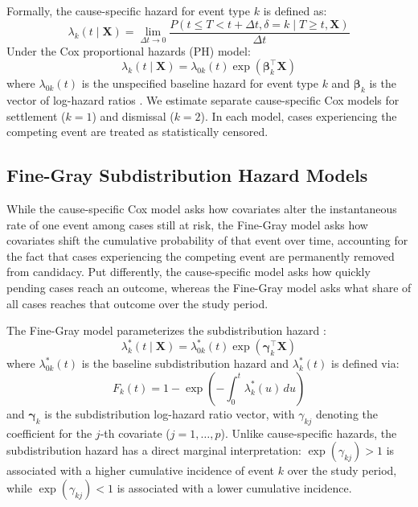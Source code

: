 Formally, the cause-specific hazard for event type $k$ is defined as:
\begin{equation}
\lambda_k(t \mid \mathbf{X}) = \lim_{\Delta t \to 0} \frac{P(t \leq T < t + \Delta t, \delta = k \mid T \geq t, \mathbf{X})}{\Delta t}
\end{equation}
Under the Cox proportional hazards (PH) model:
\begin{equation}
\label{eq:cox_ph}
\lambda_k(t \mid \mathbf{X}) = \lambda_{0k}(t) \exp(\boldsymbol{\beta}_k^\top \mathbf{X})
\end{equation}
where $\lambda_{0k}(t)$ is the unspecified baseline hazard for event type $k$ and $\boldsymbol{\beta}_k$ is the vector of log-hazard ratios \citep{cox1972}. We estimate separate cause-specific Cox models for settlement ($k = 1$) and dismissal ($k = 2$). In each model, cases experiencing the competing event are treated as statistically censored.

\subsection{Fine-Gray Subdistribution Hazard Models}

While the cause-specific Cox model asks how covariates alter the
instantaneous rate of one event among cases still at risk, the
Fine-Gray model asks how covariates shift the cumulative
probability of that event over time, accounting for the fact
that cases experiencing the competing event are permanently
removed from candidacy. Put differently, the cause-specific
model asks how quickly pending cases reach an outcome,
whereas the Fine-Gray model asks what share of all cases
reaches that outcome over the study period.

The Fine-Gray model parameterizes the subdistribution hazard \citep{fine1999}:
\begin{equation}
\lambda_k^*(t \mid \mathbf{X}) = \lambda_{0k}^*(t) \exp(\boldsymbol{\gamma}_k^\top \mathbf{X})
\end{equation}
where $\lambda_{0k}^*(t)$ is the baseline subdistribution hazard and $\lambda_k^*(t)$ is defined via:
\begin{equation}
F_k(t) = 1 - \exp\left(-\int_0^t \lambda_k^*(u) \, du\right)
\end{equation}
and $\boldsymbol{\gamma}_k$ is the subdistribution log-hazard ratio vector, with $\gamma_{kj}$ denoting the coefficient for the $j$-th covariate ($j = 1, \ldots, p$). Unlike cause-specific hazards, the subdistribution hazard has a direct marginal interpretation: $\exp(\gamma_{kj}) > 1$ is associated with a higher cumulative incidence of event $k$ over the study period, while $\exp(\gamma_{kj}) < 1$ is associated with a lower cumulative incidence.
